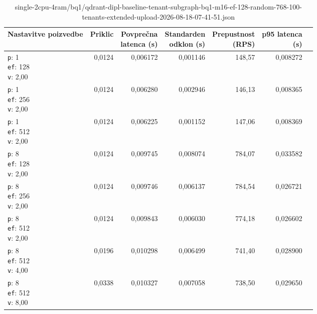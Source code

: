 \begin{table}[htbp]
  \centering
\small
  \caption{single-2cpu-4ram/bq1/qdrant-dipl-baseline-tenant-subgraph-bq1-m16-ef-128-random-768-100-tenants-extended-upload-2026-08-18-07-41-51.json}
  \label{tab:single-2cpu-4ram:bq1:qdrant-dipl-baseline-tenant-subgraph-bq1-m16-ef-128-random-768-100-tenants-extended-upload-2026-08-18-07-41-51.json}
  \begin{tabularx}{\textwidth}{Xrrrrrr}
    \toprule
    Nastavitve poizvedbe & Priklic & \makecell{Povprečna\\latenca (s)} & \makecell{Standarden\\odklon (s)} & \makecell{Prepustnost\\(RPS)} & \makecell{p95 latenca\\(s)}  \\
    \midrule
    \makecell{\texttt{p}: 1\\\texttt{ef}: 128\\\texttt{v}: 2,00} & 0,0124 & 0,006172 & 0,001146 & 148,57 & 0,008272 \\
    \makecell{\texttt{p}: 1\\\texttt{ef}: 256\\\texttt{v}: 2,00} & 0,0124 & 0,006280 & 0,002946 & 146,13 & 0,008365 \\
    \makecell{\texttt{p}: 1\\\texttt{ef}: 512\\\texttt{v}: 2,00} & 0,0124 & 0,006225 & 0,001152 & 147,06 & 0,008369 \\
    \makecell{\texttt{p}: 8\\\texttt{ef}: 128\\\texttt{v}: 2,00} & 0,0124 & 0,009745 & 0,008074 & 784,07 & 0,033582 \\
    \makecell{\texttt{p}: 8\\\texttt{ef}: 256\\\texttt{v}: 2,00} & 0,0124 & 0,009746 & 0,006137 & 784,54 & 0,026721 \\
    \makecell{\texttt{p}: 8\\\texttt{ef}: 512\\\texttt{v}: 2,00} & 0,0124 & 0,009843 & 0,006030 & 774,18 & 0,026602 \\
    \makecell{\texttt{p}: 8\\\texttt{ef}: 512\\\texttt{v}: 4,00} & 0,0196 & 0,010298 & 0,006499 & 741,40 & 0,028900 \\
    \makecell{\texttt{p}: 8\\\texttt{ef}: 512\\\texttt{v}: 8,00} & 0,0338 & 0,010327 & 0,007058 & 738,50 & 0,029650 \\

\end{tabularx}
\end{table}
